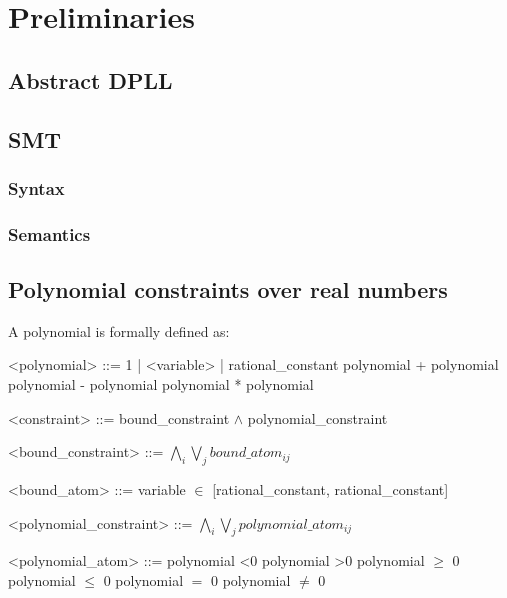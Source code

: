 \chapter{Preliminaries}
\section{Abstract DPLL}


\section{SMT}
\subsection{Syntax}

\subsection{Semantics}


\section{Polynomial constraints over real numbers}
A polynomial is formally defined as:
\begin{center}
\begin{grammar}
<polynomial> ::= 1 | <variable> | rational\_constant 
				 \alt polynomial + polynomial
			     \alt polynomial - polynomial
			     \alt polynomial * polynomial

<constraint> ::= bound\_constraint $\wedge$ polynomial\_constraint

<bound\_constraint> ::= $\bigwedge\limits_{i} \bigvee\limits_{j} bound\_atom_{ij}$

<bound\_atom> ::= variable $\in$ [rational\_constant, rational\_constant]

<polynomial\_constraint> ::= $\bigwedge\limits_{i} \bigvee\limits_{j} polynomial\_atom_{ij}$

<polynomial\_atom> ::= polynomial \textless 0
					\alt polynomial \textgreater 0
					\alt polynomial $\ge$ 0
					\alt polynomial $\le$ 0
					\alt polynomial $=$ 0
					\alt polynomial $\ne$ 0
\end{grammar}
\end{center}